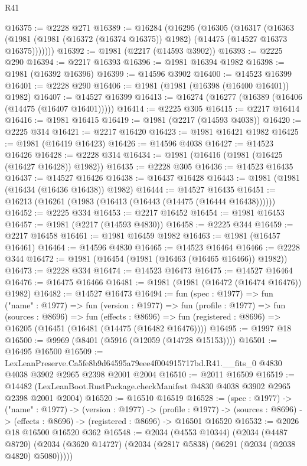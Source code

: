 \begin{lexlean}{R41}
\begin{coremodule}
@16375 := @2228 @271
@16389 := @16284
    (@16295
      (@16305
        (@16317
          (@16363 (@1981 (@1981 (@16372 (@16374 @16375)) @1982) (@14475 (@14527 @16373 @16375)))))))
@16392 := @1981 (@2217 (@14593 @3902))
@16393 := @2225 @290
@16394 := @2217 @16393
@16396 := @1981 @16394 @1982
@16398 := @1981 (@16392 @16396)
@16399 := @14596 @3902
@16400 := @14523 @16399
@16401 := @2228 @290
@16406 := @1981 (@1981 (@16398 (@16400 @16401)) @1982)
@16407 := @14527 @16399
@16413 := @16274 (@16277 (@16389 (@16406 (@14475 (@16407 @16401)))))
@16414 := @2225 @305
@16415 := @2217 @16414
@16416 := @1981 @16415
@16419 := @1981 (@2217 (@14593 @4038))
@16420 := @2225 @314
@16421 := @2217 @16420
@16423 := @1981 @16421 @1982
@16425 := @1981 (@16419 @16423)
@16426 := @14596 @4038
@16427 := @14523 @16426
@16428 := @2228 @314
@16434 := @1981 (@16416 (@1981 (@16425 (@16427 @16428)) @1982))
@16435 := @2228 @305
@16436 := @14523 @16435
@16437 := @14527 @16426
@16438 := @16437 @16428
@16443 := @1981 (@1981 (@16434 (@16436 @16438)) @1982)
@16444 := @14527 @16435
@16451 := @16213 (@16261 (@1983 (@16413 (@16443 (@14475 (@16444 @16438))))))
@16452 := @2225 @334
@16453 := @2217 @16452
@16454 := @1981 @16453
@16457 := @1981 (@2217 (@14593 @4830))
@16458 := @2225 @344
@16459 := @2217 @16458
@16461 := @1981 @16459 @1982
@16463 := @1981 (@16457 @16461)
@16464 := @14596 @4830
@16465 := @14523 @16464
@16466 := @2228 @344
@16472 := @1981 (@16454 (@1981 (@16463 (@16465 @16466)) @1982))
@16473 := @2228 @334
@16474 := @14523 @16473
@16475 := @14527 @16464
@16476 := @16475 @16466
@16481 := @1981 (@1981 (@16472 (@16474 @16476)) @1982)
@16482 := @14527 @16473
@16494 := fun (spec : @1977) =>
  fun ("name" : @1977) =>
  fun (version : @1977) =>
  fun (profile : @1977) =>
  fun (sources : @8696) =>
  fun (effects : @8696) =>
  fun (registered : @8696) => @16205 (@16451 (@16481 (@14475 (@16482 @16476))))
@16495 := @1997 @18
@16500 := @9969 (@8401 (@5916 (@12059 (@14728 @15153))))
@16501 := @16495 @16500
@16509 := LexLeanPreserve.Ca5fe8b9d64595a79eee4f004915717bd.R41.__fits_0
    @4830
    @4038
    @3902
    @2965
    @2398
    @2001
    @2004
@16510 := @2011 @16509
@16519 := @14482 (LexLeanBoot.RustPackage.checkManifest @4830 @4038 @3902 @2965 @2398 @2001 @2004)
@16520 := @16510 @16519
@16528 := (spec : @1977) ->
  ("name" : @1977) ->
  (version : @1977) ->
  (profile : @1977) ->
  (sources : @8696) -> (effects : @8696) -> (registered : @8696) -> @16501 @16520
@16532 := @2026 @18 @16500 @16520 @362
@16548 := @2034
    (@4553 @10344)
    (@2034
      (@4487 @8720)
      (@2034 (@3620 @14727) (@2034 (@2817 @5838) (@6291 (@2034 (@2038 @4820) @5080)))))

\end{coremodule}
\end{lexlean}
